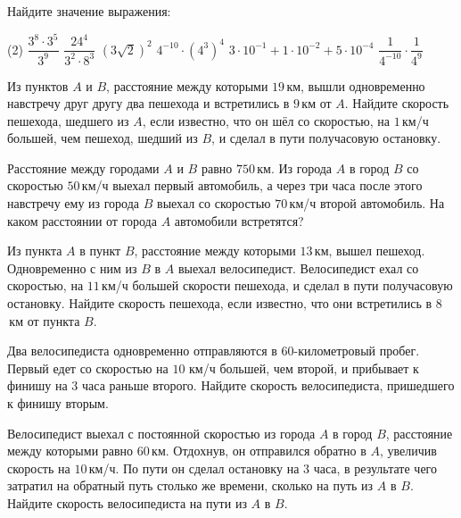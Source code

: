 \begin{class}[number=5]
	\begin{listofex}
		\item Найдите значение выражения:
		\begin{tasks}(2)
			\task \( \dfrac{3^8\cdot3^5}{3^9} \)
			\task \( \dfrac{24^4}{3^2\cdot8^3} \)
			\task \( (3\sqrt{2})^2 \)
			\task \( 4^{-10}\cdot(4^3)^4 \)
			\task \( 3\cdot10^{-1}+1\cdot10^{-2}+5\cdot10^{-4} \)
			\task \( \dfrac{1}{4^{-10}}\cdot\dfrac{1}{4^{9}} \)
		\end{tasks}
		\item Из пунктов \( A \) и \( B \), расстояние между которыми \( 19 \) км, вышли одновременно навстречу друг другу два пешехода и встретились в \( 9 \) км от \( A \). Найдите скорость пешехода, шедшего из \( A \), если известно, что он шёл со скоростью, на \( 1 \) км/ч большей, чем пешеход, шедший из \( B \), и сделал в пути получасовую остановку.
		\item Расстояние между городами \( A \) и \( B \) равно \( 750 \) км. Из города \( A \) в город \( B \) со скоростью \( 50 \) км/ч выехал первый автомобиль, а через три часа после этого навстречу ему из города \( B \) выехал со скоростью \( 70 \) км/ч второй автомобиль. На каком расстоянии от города \( A \) автомобили встретятся?
		\item Из пункта \( A \) в пункт \( B \), расстояние между которыми \( 13 \) км, вышел пешеход. Одновременно с ним из \( B \) в \( A \) выехал велосипедист. Велосипедист ехал со скоростью, на \( 11 \) км/ч большей скорости пешехода, и сделал в пути получасовую остановку. Найдите скорость пешехода, если известно, что они встретились в \( 8 \) км от пункта \( B \).
		\item Два велосипедиста одновременно отправляются в \( 60 \)-километровый пробег. Первый едет со скоростью на \( 10 \) км/ч большей, чем второй, и прибывает к финишу на \( 3 \) часа раньше второго. Найдите скорость велосипедиста, пришедшего к финишу вторым.
		\item Велосипедист выехал с постоянной скоростью из города \( A \) в город \( B \), расстояние между которыми равно \( 60 \) км. Отдохнув, он отправился обратно в \( A \), увеличив скорость на \( 10 \) км/ч. По пути он сделал остановку на \( 3 \) часа, в результате чего затратил на обратный путь столько же времени, сколько на путь из \( A \) в \( B \). Найдите скорость велосипедиста на пути из \( A \) в \( B \).
	\end{listofex}
\end{class}

